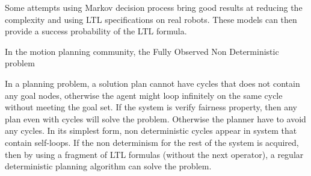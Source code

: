 Some attempts using Markov decision process bring good results at reducing the complexity and using LTL specifications on real robots. These models can then provide a success probability of the LTL formula. 

In the motion planning community, the Fully Observed Non Deterministic problem  

In a planning problem, a solution plan cannot have cycles that does not contain any goal nodes, otherwise the agent might loop infinitely on the same cycle without meeting the goal set. If the system is verify fairness property, then any plan even with cycles will solve the problem. Otherwise the planner have to avoid any cycles.
In its simplest form, non deterministic cycles appear in system that contain self-loops. If the non determinism for the rest of the system is acquired, then by using a fragment of LTL formulas (without the next operator), a regular deterministic planning algorithm can solve the problem.





